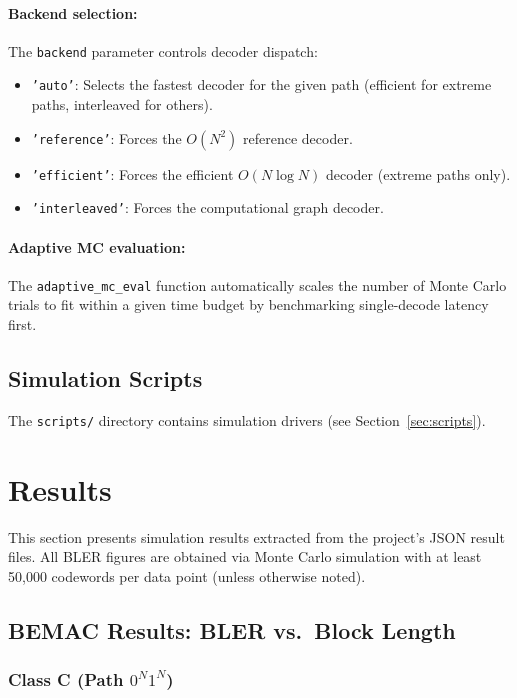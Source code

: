 \documentclass[11pt,a4paper]{article}
\begin{document}
\paragraph{Backend selection:}
The \texttt{backend} parameter controls decoder dispatch:
\begin{itemize}
  \item \texttt{'auto'}: Selects the fastest decoder for the given path (efficient for extreme paths, interleaved for others).
  \item \texttt{'reference'}: Forces the $O(N^2)$ reference decoder.
  \item \texttt{'efficient'}: Forces the efficient $O(N \log N)$ decoder (extreme paths only).
  \item \texttt{'interleaved'}: Forces the computational graph decoder.
\end{itemize}

\paragraph{Adaptive MC evaluation:}
The \texttt{adaptive\_mc\_eval} function automatically scales the number
of Monte Carlo trials to fit within a given time budget by benchmarking
single-decode latency first.

\subsection{Simulation Scripts}

The \texttt{scripts/} directory contains simulation drivers (see Section~\ref{sec:scripts}).


\section{Results}
\label{sec:results}

This section presents simulation results extracted from the project's JSON
result files. All BLER figures are obtained via Monte Carlo simulation with
at least 50{,}000 codewords per data point (unless otherwise noted).

\subsection{BEMAC Results: BLER vs.\ Block Length}

\subsubsection{Class C (Path $0^N 1^N$)}
\end{document}
